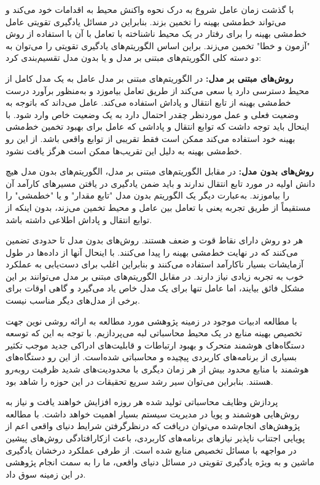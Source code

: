 با گذشت زمان عامل شروع به درک نحوه واکنش محیط به اقدامات خود می‌کند و می‌تواند خط‌مشی بهینه را تخمین بزند. بنابراین در مسائل یادگیری تقویتی عامل خط‌مشی بهینه را برای رفتار در یک محیط ناشناخته با تعامل با آن با استفاده از روش "آزمون و خطا" تخمین می‌زند. براین اساس الگوریتم‌های یادگیری تقویتی را می‌توان به دو دسته کلی الگوریتم‌های مبتنی بر مدل و یا بدون مدل تقسیم‌بندی کرد:


 \textbf{روش‌های مبتنی بر مدل:}
در الگوریتم‌های مبتنی بر مدل عامل به یک مدل کامل از محیط دسترسی
دارد یا سعی می‌کند از طریق تعامل بیاموزد و به‌منظور برآورد درست خط‌مشی بهینه از تابع انتقال و  پاداش استفاده می‌کند. عامل می‌داند که باتوجه به وضعیت فعلی و عمل موردنظر چقدر احتمال دارد به یک وضعیت خاص وارد شود. با اینحال باید توجه داشت که توابع انتقال و پاداشی که عامل برای بهبود تخمین خط‌مشی بهینه خود استفاده می‌کند ممکن است فقط تقریبی از توابع واقعی باشد. از این رو خط‌مشی بهینه به دلیل این تقریب‌ها ممکن است هرگز یافت نشود.

  \textbf{روش‌های بدون مدل:}
در مقابل الگوریتم‌های مبتنی بر مدل، الگوریتم‌های بدون مدل هیچ دانش
اولیه در مورد تابع انتقال ندارند و باید ضمن یادگیری در یافتن مسیرهای کارآمد آن را بیاموزند.  به‌عبارت دیگر یک الگوریتم بدون مدل "تابع مقدار" و یا "خطمشی" را مستقیماً از طریق تجربه یعنی
با تعامل بین عامل و محیط تخمین می‌زند، بدون اینکه از توابع انتقال و پاداش اطلاعی داشته باشد.


هر دو روش دارای نقاط قوت و ضعف هستند. روش‌های بدون مدل تا حدودی تضمین می‌کنند که در نهایت خط‌مشی بهینه را پیدا می‌کنند. با اینحال آنها از داده‌ها در طول آزمایشات بسیار ناکارآمد استفاده می‌کنند و بنابراین اغلب برای دست‌یابی به عملکرد خوب به تجربه زیادی نیاز دارند. در مقابل الگوریتم‌های مبتنی بر مدل می‌توانند بر این مشکل فائق بیایند، اما عامل تنها برای یک مدل خاص یاد می‌گیرد و گاهی اوقات برای برخی از مدل‌های دیگر مناسب نیست. 




با مطالعه ادبیات موجود در زمینه پژوهشی مورد مطالعه به ارائه روشی نوین جهت تخصیص بهینه منابع در یک محیط محاسباتی لبه می‌پردازیم.  با توجه به این که توسعه دستگاه‌های هوشمند متحرک و بهبود ارتباطات و قابلیت‌های ادراکی جدید موجب تکثیر بسیاری از برنامه‌های کاربردی پیچیده و محاسباتی شده‌است. از این رو دستگاه‌های هوشمند با منابع محدود بیش از هر زمان دیگری با محدودیت‌های شدید ظرفیت روبه‌رو هستند. بنابراین می‌توان سیر رشد سریع تحقیقات در این حوزه را شاهد بود. 

پردازش وظایف محاسباتی تولید شده هر روزه افزایش خواهند یافت و نیاز به روش‌هایی هوشمند و پویا در مدیریت سیستم بسیار اهمیت خواهد داشت. با مطالعه پژوهش‌های انجام‌شده می‌توان دریافت که درنظرگرفتن شرایط دنیای واقعی اعم از پویایی اجتناب ناپذیر نیازهای برنامه‌های کاربردی، باعث ازکارافتادگی روش‌های پیشین در مواجهه با مسائل تخصیص منابع شده است. از طرفی عملکرد درخشان یادگیری ماشین و به‌ ویژه یادگیری تقویتی در مسائل دنیای واقعی، ما را به سمت انجام پژوهشی در این زمینه سوق داد.


